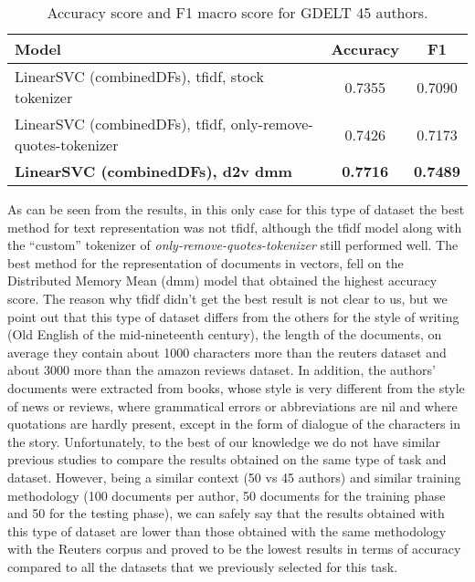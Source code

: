\begin{table}[h!]
	\begin{center}  
		\caption[GDELT Results - 45 authors]{Accuracy score and F1 macro score for GDELT 45 authors.} 
		\label{tab:tableGDELT}
		\begin{tabular}{| p{5 cm} | c | c |}
			\hline 
			Model & Accuracy & F1 \\
			\hline
			LinearSVC (combinedDFs), tfidf, stock tokenizer & 0.7355 & 0.7090 \\ \hline
			LinearSVC (combinedDFs), tfidf, only-remove-quotes-tokenizer & 0.7426 & 0.7173 \\ \hline
			\textbf{LinearSVC (combinedDFs), d2v dmm} & \textbf{0.7716} & \textbf{0.7489} \\ \hline
		\end{tabular} 
	\end{center}
\end{table}

As can be seen from the results, in this only case for this type of dataset the best method for text representation was not tfidf, although the tfidf model along with the \enquote{custom} tokenizer of \textit{only-remove-quotes-tokenizer} still performed well.
The best method for the representation of documents in vectors, fell on the Distributed Memory Mean (dmm) model that obtained the highest accuracy score. 
The reason why tfidf didn't get the best result is not clear to us, but we point out that this type of dataset differs from the others for the style of writing (Old English of the mid-nineteenth century), the length of the documents, on average they contain about 1000 characters more than the reuters dataset and about 3000 more than the amazon reviews dataset.
In addition, the authors' documents were extracted from books, whose style is very different from the style of news or reviews, where grammatical errors or abbreviations are nil and where quotations are hardly present, except in the form of dialogue of the characters in the story. Unfortunately, to the best of our knowledge we do not have similar previous studies to compare the results obtained on the same type of task and dataset. However, being a similar context (50 vs 45 authors) and similar training methodology (100 documents per author, 50 documents for the training phase and 50 for the testing phase), we can safely say that the results obtained with this type of dataset are lower than those obtained with the same methodology with the Reuters corpus and proved to be the lowest results in terms of accuracy compared to all the datasets that we previously selected for this task.



